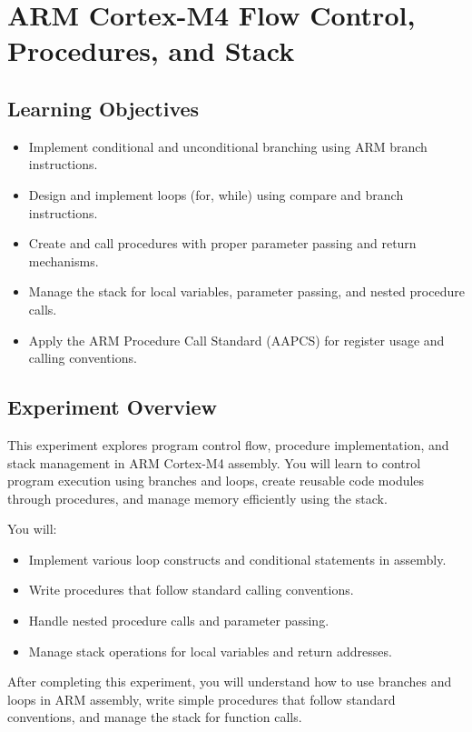 \chapter{ARM Cortex-M4 Flow Control, Procedures, and Stack}

\section*{Learning Objectives}
\begin{itemize}[nosep]
  \item Implement conditional and unconditional branching using ARM branch instructions.
  \item Design and implement loops (for, while) using compare and branch instructions.
  \item Create and call procedures with proper parameter passing and return mechanisms.
  \item Manage the stack for local variables, parameter passing, and nested procedure calls.
  \item Apply the ARM Procedure Call Standard (AAPCS) for register usage and calling conventions.
\end{itemize}

\section*{Experiment Overview}
This experiment explores program control flow, procedure implementation, and stack management in ARM Cortex-M4 assembly. You will learn to control program execution using branches and loops, create reusable code modules through procedures, and manage memory efficiently using the stack.

\noindent You will:
\begin{itemize}[nosep]
  \item Implement various loop constructs and conditional statements in assembly.
  \item Write procedures that follow standard calling conventions.
  \item Handle nested procedure calls and parameter passing.
  \item Manage stack operations for local variables and return addresses.
\end{itemize}
After completing this experiment, you will understand how to use branches and loops in ARM assembly, write simple procedures that follow standard conventions, and manage the stack for function calls.

